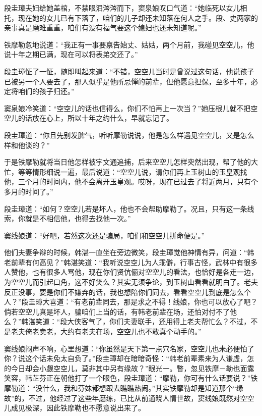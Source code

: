 \documentclass[12pt,oneside]{book}
\begin{document}
段圭璋夫妇给她盖棺，不禁眼泪涔涔而下，窦泉娘叹口气道：``她临死以女儿相托，现在她的女儿已有下落了，咱们的儿子却还未知落在何人之手。段、史两家的亲事真是磨难重重，咱们有没有福气要这个媳妇也还未知道呢。''

铁摩勒忽地说道：``我正有一事要禀告始丈、姑姑，两个月前，我碰见空空儿，他说十年之期已满，现在可以将表弟交还了。''

段圭璋怔了一怔，随即叫起来道：``不错，空空儿当时是曾说过这句话，他说孩子已被另一个人要去了，那人似乎是他所忌惮的前辈，但他愿意担保，至多十年，必定将咱们的孩子归还。''

窦泉娘冷笑道：``空空儿的话也信得么，你们不怕再上一次当？''她压根儿就不把空空儿的话放在心上，所以十年之约什么，早就忘记了。

段圭璋道：``你且先别发脾气，听听摩勒说说，他是怎么样遇见空空儿，又是怎么样和他谈的？''

于是铁摩勒就将当日他怎样被宇文通追捕，后来空空儿怎样突然出现，帮了他的大忙，等等情形细说一遍，最后说道：``空空儿说，请你们再上玉树山的玉皇观找他，三个月的时间内，他不会离开玉皇观。哎呀，现在已过去了将近两月，只有个多月的时间了。''

段圭璋道：``如何？空空儿若是坏人，他也不会帮助摩勒了。况且，只有这一条线索，你就是不相信他，也得去找他一次。''

窦线娘道：``好吧，若然这次还是骗局，咱们和空空儿拼命便是。''

他们夫妻争辩的时候，韩湛一直坐在旁边微笑，段圭璋觉他神情有异，问道：``韩老前辈有何高见？''韩湛笑道：``我听说空空儿为人乖僻，行事古怪，武林中有很多人赞他，也有很多人骂他，现在你们贤伉俪对空空儿的看法，也恰好是各走一边，为空空儿而引起口角，这不好笑么？其实无须争论，到玉树山看看就明白了。老夫反正没事，要是你们不嫌弃的话，我也想陪你们同去，看看空空儿到底是怎么个人？''段圭璋大喜道：``有老前辈同去，那是求之不得！线娘，你也可以放心了吧？倘若空空儿真是坏人，骗咱们上当的话，有韩老前辈在场，还怕对付不了他么？''韩湛笑道：``段大侠客气了，你们夫妻联手，还用得上老夫帮忙么？不过，不是老夫倚老卖老，大约有老夫在场，空空儿也不敢真个动手的。''

窦线娘闷声不响，心里想道：``你虽然是天下第一点穴名家，空空儿也未必便怕了你？说这个话未免太自负了。''段圭璋却在暗暗奇怪：``韩老前辈素来为人谦虚，怎的今日却会小觑空空儿，莫非其中另有缘故？''眼光一。瞥，忽见铁摩－勒也面露笑容，韩芷芬正在朝他打了一个眼色，段圭璋道：``摩勒，你可有什么话要说？''铁摩勒道：``没什么，我和芬妹都想跟去瞧瞧热闹。''其实铁摩勒却是知道那个``缘故''的，不过，他经过了这些年磨练，已比从前通晓人情世故，窦线娘既然对空空儿成见极深，因此铁摩勒也不愿意说出来了。
\end{document}
